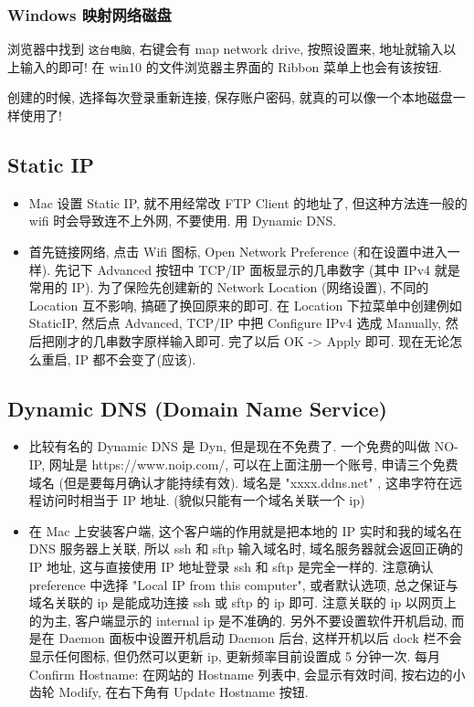 \subsubsection{Windows 映射网络磁盘}
浏览器中找到 \verb`这台电脑`, 右键会有 map network drive, 按照设置来, 地址就输入以上输入的即可! 在 win10 的文件浏览器主界面的 Ribbon 菜单上也会有该按钮.

创建的时候, 选择每次登录重新连接, 保存账户密码, 就真的可以像一个本地磁盘一样使用了!

\subsection{Static IP}
\begin{itemize}
\item Mac 设置 Static IP, 就不用经常改 FTP Client 的地址了, 但这种方法连一般的 wifi 时会导致连不上外网, 不要使用. 用 Dynamic DNS.
\item 首先链接网络, 点击 Wifi 图标, Open Network Preference (和在设置中进入一样). 先记下 Advanced 按钮中 TCP/IP 面板显示的几串数字 (其中 IPv4 就是常用的 IP). 为了保险先创建新的 Network Location (网络设置), 不同的 Location 互不影响, 搞砸了换回原来的即可. 在 Location 下拉菜单中创建例如 StaticIP, 然后点 Advanced, TCP/IP 中把 Configure IPv4 选成 Manually, 然后把刚才的几串数字原样输入即可. 完了以后 OK -> Apply 即可. 现在无论怎么重启, IP 都不会变了(应该).
\end{itemize}

\subsection{Dynamic DNS (Domain Name Service)}
\begin{itemize}
\item 比较有名的 Dynamic DNS 是 Dyn, 但是现在不免费了. 一个免费的叫做 NO-IP, 网址是 https://www.noip.com/, 可以在上面注册一个账号, 申请三个免费域名 (但是要每月确认才能持续有效).  域名是 "xxxx.ddns.net"  , 这串字符在远程访问时相当于 IP 地址. (貌似只能有一个域名关联一个 ip)

\item 在 Mac 上安装客户端, 这个客户端的作用就是把本地的 IP 实时和我的域名在 DNS 服务器上关联, 所以 ssh 和 sftp 输入域名时, 域名服务器就会返回正确的 IP 地址, 这与直接使用 IP 地址登录 ssh 和 sftp 是完全一样的.
注意确认 preference 中选择 "Local IP from this computer", 或者默认选项, 总之保证与域名关联的 ip 是能成功连接 ssh 或 sftp 的 ip 即可. 注意关联的 ip 以网页上的为主, 客户端显示的 internal ip 是不准确的.
另外不要设置软件开机启动, 而是在 Daemon 面板中设置开机启动 Daemon 后台, 这样开机以后 dock 栏不会显示任何图标, 但仍然可以更新 ip, 更新频率目前设置成 5 分钟一次.
每月 Confirm Hostname: 在网站的 Hostname 列表中, 会显示有效时间, 按右边的小齿轮 Modify, 在右下角有 Update Hostname 按钮.
\end{itemize}
